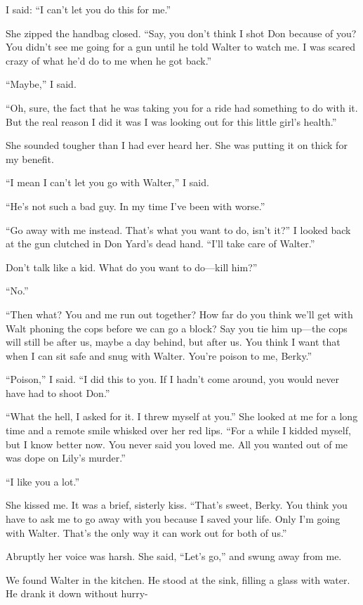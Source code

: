 \documentclass{novel}
\begin{document}
I said: “I can’t let you do this for me.”

She zipped the handbag closed. “Say, you don’t think I shot Don because of you? You didn’t see me going for a gun until he told Walter to watch me. I was scared crazy of what he’d do to me when he got back.”

“Maybe,” I said.

“Oh, sure, the fact that he was taking you for a ride had something to do with it. But the real reason I did it was I was looking out for this little girl’s health.”

She sounded tougher than I had ever heard her. She was putting it on thick for my benefit.

“I mean I can’t let you go with Walter,” I said.

“He’s not such a bad guy. In my time I’ve been with worse.”

“Go away with me instead. That’s what you want to do, isn’t it?” I looked back at the gun clutched in Don Yard’s dead hand. “I’ll take care of Walter.”

Don’t talk like a kid. What do you want to do—kill him?”

“No.”

“Then what? You and me run out together? How far do you think we’ll get with Walt phoning the cops before we can go a block? Say you tie him up—the cops will still be after us, maybe a day behind, but after us. You think I want that when I can sit safe and snug with Walter. You’re poison to me, Berky.”

“Poison,” I said. “I did this to you. If I hadn’t come around, you would never have had to shoot Don.”

“What the hell, I asked for it. I threw myself at you.” She looked at me for a long time and a remote smile whisked over her red lips. “For a while I kidded myself, but I know better now. You never said you loved me. All you wanted out of me was dope on Lily’s murder.”

“I like you a lot.”

She kissed me. It was a brief, sisterly kiss. “That’s sweet, Berky. You think you have to ask me to go away with you because I saved your life. Only I’m going with Walter. That’s the only way it can work out for both of us.”

Abruptly her voice was harsh. She said, “Let’s go,” and swung away from me.

We found Walter in the kitchen. He stood at the sink, filling a glass with water. He drank it down without hurry-
\end{document}

